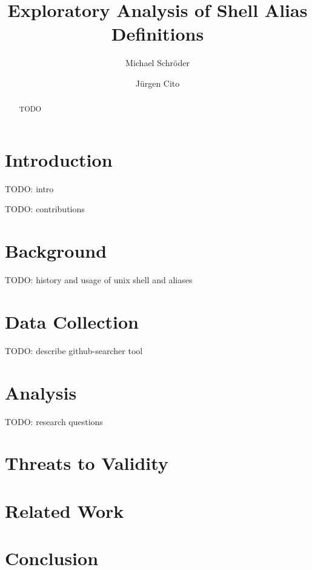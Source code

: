 \documentclass[sigconf,review]{acmart}
\begin{document}
\title{Exploratory Analysis of Shell Alias Definitions}

\author{Michael Schröder}

\author{Jürgen Cito}

\begin{abstract}
	TODO
\end{abstract}

\maketitle

\section{Introduction}

TODO: intro

TODO: contributions

\section{Background}

TODO: history and usage of unix shell and aliases

\section{Data Collection}

TODO: describe github-searcher tool

\section{Analysis}

TODO: research questions

\section{Threats to Validity}

\section{Related Work}

\section{Conclusion}


%
\end{document}
